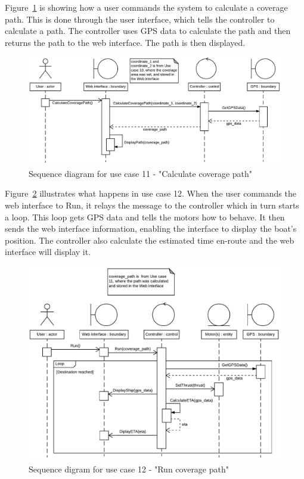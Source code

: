 Figure~\ref{fig:usecase11sd} is showing how a user commands the system to calculate a coverage path. This is done through the user interface, which tells the controller to calculate a path. The controller uses GPS data to calculate the path and then returns the path to the web interface. The path is then displayed.

\begin{figure}[H]
\centering
\includegraphics[width=1\linewidth]{../Appendix/Project/Dokumentation/Images/System_architecture/Use_case_11_SD}
\caption{Sequence diagram for use case 11 - "Calculate coverage path"}
\label{fig:usecase11sd}
\end{figure}

Figure~\ref{fig:usecase12sd} illustrates what happens in use case 12. When the user commands the web interface to Run, it relays the message to the controller which in turn starts a loop. This loop gets GPS data and tells the motors how to behave. It then sends the web interface information, enabling the interface to display the boat's position. The controller also calculate the estimated time en-route and the web interface will display it.

\begin{figure}[H]
\centering
\includegraphics[width=1\linewidth]{../Appendix/Project/Dokumentation/Images/System_architecture/Use_case_12_SD}
\caption{Sequence digram for use case 12 - "Run coverage path"}
\label{fig:usecase12sd}
\end{figure}


